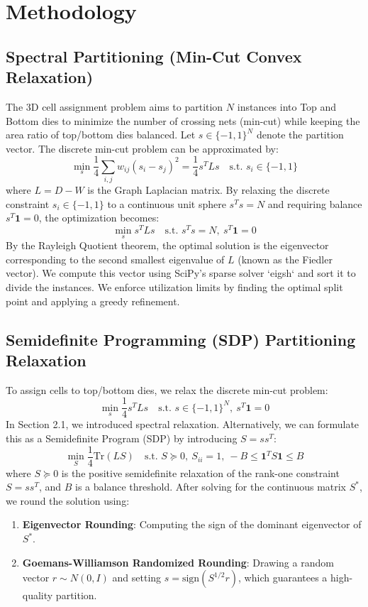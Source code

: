 \documentclass[10pt, twocolumn]{article}
\begin{document}
\section{Methodology}

\subsection{Spectral Partitioning (Min-Cut Convex Relaxation)}
The 3D cell assignment problem aims to partition $N$ instances into Top and Bottom dies to minimize the number of crossing nets (min-cut) while keeping the area ratio of top/bottom dies balanced. Let $s \in \{-1, 1\}^N$ denote the partition vector. The discrete min-cut problem can be approximated by:
\begin{equation}
\min_{s} \frac{1}{4} \sum_{i,j} w_{ij}(s_i - s_j)^2 = \frac{1}{4} s^T L s \quad \text{s.t. } s_i \in \{-1,1\}
\end{equation}
where $L = D - W$ is the Graph Laplacian matrix. By relaxing the discrete constraint $s_i \in \{-1,1\}$ to a continuous unit sphere $s^T s = N$ and requiring balance $s^T \mathbf{1} = 0$, the optimization becomes:
\begin{equation}
\min_{s} s^T L s \quad \text{s.t. } s^T s = N, \ s^T \mathbf{1} = 0
\end{equation}
By the Rayleigh Quotient theorem, the optimal solution is the eigenvector corresponding to the second smallest eigenvalue of $L$ (known as the Fiedler vector). We compute this vector using SciPy's sparse solver `eigsh` and sort it to divide the instances. We enforce utilization limits by finding the optimal split point and applying a greedy refinement.

\subsection{Semidefinite Programming (SDP) Partitioning Relaxation}
To assign cells to top/bottom dies, we relax the discrete min-cut problem:
\begin{equation}
\min_{s} \frac{1}{4} s^T L s \quad \text{s.t. } s \in \{-1, 1\}^N, \ s^T \mathbf{1} = 0
\end{equation}
In Section 2.1, we introduced spectral relaxation. Alternatively, we can formulate this as a Semidefinite Program (SDP) by introducing $S = s s^T$:
\begin{equation}
\min_{S} \frac{1}{4} \text{Tr}(L S) \quad \text{s.t. } S \succeq 0, \ S_{ii} = 1, \ -B \le \mathbf{1}^T S \mathbf{1} \le B
\end{equation}
where $S \succeq 0$ is the positive semidefinite relaxation of the rank-one constraint $S = s s^T$, and $B$ is a balance threshold. After solving for the continuous matrix $S^*$, we round the solution using:
\begin{enumerate}
\item \textbf{Eigenvector Rounding}: Computing the sign of the dominant eigenvector of $S^*$.
\item \textbf{Goemans-Williamson Randomized Rounding}: Drawing a random vector $r \sim N(0, I)$ and setting $s = \text{sign}(S^{1/2} r)$, which guarantees a high-quality partition.
\end{enumerate}
\end{document}

